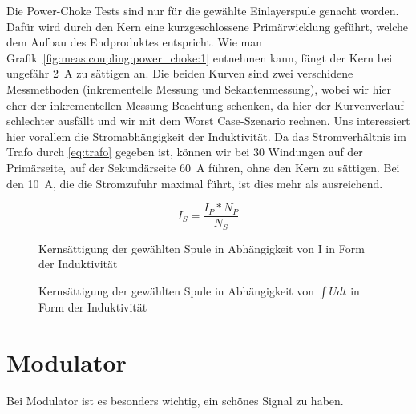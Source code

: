 Die  Power-Choke Tests  sind nur  f\"ur die  gew\"ahlte Einlayerspule  genacht
worden. Daf\"ur  wird durch  den Kern  eine kurzgeschlossene  Prim\"arwicklung
gef\"uhrt,   welche   dem   Aufbau  des   Endproduktes   entspricht. Wie   man
Grafik~\ref{fig:meas:coupling:power_choke:1} entnehmen kann,  f\"angt der Kern
bei  ungef\"ahr  \SI{2}{\ampere}  zu  s\"attigen an. Die  beiden  Kurven  sind
zwei  verschidene Messmethoden  (inkrementelle  Messung und  Sekantenmessung),
wobei  wir  hier  eher  der  inkrementellen  Messung  Beachtung  schenken,  da
hier  der   Kurvenverlauf  schlechter  ausf\"allt   und  wir  mit   dem  Worst
Case-Szenario rechnen. Uns interessiert  hier vorallem die Stromabh\"angigkeit
der  Induktivit\"at. Da das  Stromverh\"altnis im  Trafo durch  \ref{eq:trafo}
gegeben ist,  k\"onnen wir  bei 30  Windungen auf  der Prim\"arseite,  auf der
Sekund\"arseite \SI{60}{\ampere}  f\"uhren, ohne  den Kern  zu s\"attigen. Bei
den \SI{10}{\ampere}, die  die Stromzufuhr maximal f\"uhrt, ist  dies mehr als
ausreichend.

\begin{equation}\label{eq:trafo}
    I_S = \frac{I_P * N_P}{N_S}
\end{equation}

\begin{figure}[h!tb]
    \centering
    
    \caption[Messresultate Kopplungsspule]{Kernsättigung der gewählten Spule in Abhängigkeit von I in Form der Induktivität}
    \label{fig:meas:coupling:coil:power_choke:1}
\end{figure}

\begin{figure}[h!tb]
    \centering
    
    \caption[Messresultate Kopplungsspule]{Kernsättigung der gewählten Spule in Abhängigkeit von $\int U dt$ in Form der Induktivität}
    \label{fig:meas:coupling:coil:power_choke:2}
\end{figure}

\section{Modulator}
\label{sec:val:modulator}

Bei Modulator ist es besonders wichtig, ein sch\"ones Signal zu haben.

